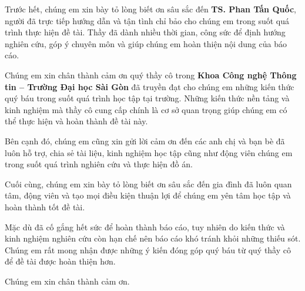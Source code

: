 \documentclass[14pt, a4paper]{report}
\begin{document}
Trước hết, chúng em xin bày tỏ lòng biết ơn sâu sắc đến \textbf{TS. Phan Tấn Quốc}, người đã trực tiếp hướng dẫn và tận tình chỉ bảo cho chúng em trong suốt quá trình thực hiện đề tài. Thầy đã dành nhiều thời gian, công sức để định hướng nghiên cứu, góp ý chuyên môn và giúp chúng em hoàn thiện nội dung của báo cáo.

Chúng em xin chân thành cảm ơn quý thầy cô trong \textbf{Khoa Công nghệ Thông tin -- Trường Đại học Sài Gòn} đã truyền đạt cho chúng em những kiến thức quý báu trong suốt quá trình học tập tại trường. Những kiến thức nền tảng và kinh nghiệm mà thầy cô cung cấp chính là cơ sở quan trọng giúp chúng em có thể thực hiện và hoàn thành đề tài này.

Bên cạnh đó, chúng em cũng xin gửi lời cảm ơn đến các anh chị và bạn bè đã luôn hỗ trợ, chia sẻ tài liệu, kinh nghiệm học tập cũng như động viên chúng em trong suốt quá trình nghiên cứu và thực hiện đồ án.

Cuối cùng, chúng em xin bày tỏ lòng biết ơn sâu sắc đến gia đình đã luôn quan tâm, động viên và tạo mọi điều kiện thuận lợi để chúng em yên tâm học tập và hoàn thành tốt đề tài.

Mặc dù đã cố gắng hết sức để hoàn thành báo cáo, tuy nhiên do kiến thức và kinh nghiệm nghiên cứu còn hạn chế nên báo cáo khó tránh khỏi những thiếu sót. Chúng em rất mong nhận được những ý kiến đóng góp quý báu từ quý thầy cô để đề tài được hoàn thiện hơn.

Chúng em xin chân thành cảm ơn.

\newpage

\tableofcontents

\end{document}
